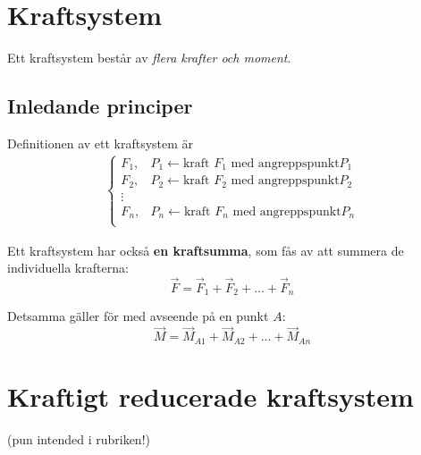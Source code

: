 \documentclass{article}
\newenvironment{ankiflashcard}[1]{}{}
\begin{document}
\begin{paracol}{2}
\begin{ankiflashcard}{Vad är ett kraftsystem?}
\section{Kraftsystem}
Ett kraftsystem består av \textit{flera krafter och moment}.
\subsection{Inledande principer}
Definitionen av ett kraftsystem är
\begin{align*}
\begin{cases}
    F_1, & P_1 \leftarrow \text{kraft } F_1 \text{ med angreppspunkt} P_1 \\
    F_2, & P_2 \leftarrow \text{kraft } F_2 \text{ med angreppspunkt} P_2 \\
    \vdots \\
    F_n, & P_n \leftarrow \text{kraft } F_n \text{ med angreppspunkt} P_n \\
\end{cases}
\end{align*}


    
\end{ankiflashcard}

\begin{ankiflashcard}{Formulera kraftsumma med avseende på en punkt.}
    
Ett kraftsystem har också \textbf{en kraftsumma}, som fås av att summera de individuella krafterna:
$$
\vec F = \vec F_1+\vec F_2+...+\vec F_n
$$

\end{ankiflashcard}

\begin{ankiflashcard}{Formulera momentsumma med avseende på en punkt.}
    
Detsamma gäller för  med avseende på en punkt $A$:
$$
\vec M = \vec M_{A1}+\vec M_{A2}+...+\vec M_{An}
$$
\end{ankiflashcard}

\section[title]{Kraftigt reducerade kraftsystem}
(pun intended i rubriken!)
\begin{ankiflashcard}{Vad är en enkraftsresultant?}
    

\end{ankiflashcard}
\end{paracol}
\end{document}
